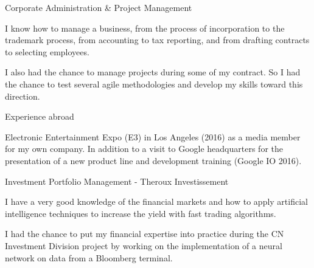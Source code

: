 

\begin{cventries}

  \cventry
    {}
    {Corporate Administration \& Project Management}
    {}
    {}
    {
      \begin{cvitems} 
        \item {I know how to manage a business, from the process of incorporation to the trademark process, from accounting to tax reporting, and from drafting contracts to selecting employees.}
		\item {I also had the chance to manage projects during some of my contract. So I had the chance to test several agile methodologies and develop my skills toward this direction.}
      \end{cvitems}
    }

  \cventry
    {}
    {Experience abroad}
    {}
    {}
    {
      \begin{cvitems}
        \item {Electronic Entertainment Expo (E3) in Los Angeles (2016) as a media member for my own company. In addition to a visit to Google headquarters for the presentation of a new product line and development training (Google IO 2016).}
      \end{cvitems}
    }

  \cventry
    {}
    {Investment Portfolio Management - Theroux Investissement}
    {}
    {}
    {
      \begin{cvitems}
        \item {I have a very good knowledge of the financial markets and how to apply artificial intelligence techniques to increase the yield with fast trading algorithms.}
		\item {I had the chance to put my financial expertise into practice during the CN Investment Division project by working on the implementation of a neural network on data from a Bloomberg terminal.}
      \end{cvitems}
    }

\end{cventries}
